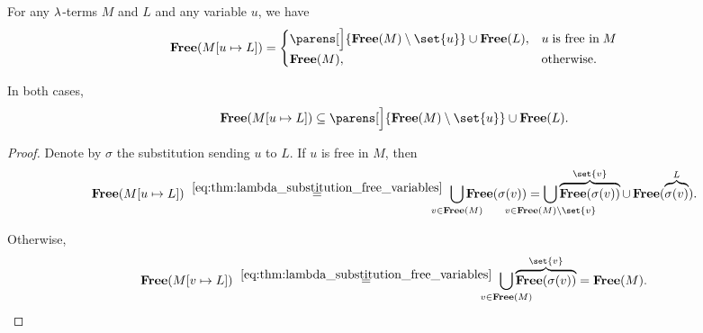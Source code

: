 \begin{corollary}\label{thm:lambda_substitution_free_variables_single}
  For any \( \mathrm{\lambda} \)-terms \( M \) and \( L \) and any variable \( u \), we have
  \begin{equation}\label{eq:thm:lambda_substitution_free_variables_single}
    \op*{Free}( M[u \mapsto L] ) = \begin{cases}
      \parens[\Big]{ \op*{Free}(M) \setminus \set{ u } } \cup \op*{Free}(L), &u \T{is free in} M \\
      \op*{Free}(M),                                                         &\T{otherwise.}
    \end{cases}
  \end{equation}

  In both cases,
  \begin{equation}\label{eq:thm:lambda_substitution_free_variables_single/subset}
    \op*{Free}( M[u \mapsto L] ) \subseteq \parens[\Big]{ \op*{Free}(M) \setminus \set{ u } } \cup \op*{Free}(L).
  \end{equation}
\end{corollary}
\begin{proof}
  Denote by \( \sigma \) the substitution sending \( u \) to \( L \). If \( u \) is free in \( M \), then
  \begin{equation*}
    \op*{Free}(M[u \mapsto L])
    \reloset{\eqref{eq:thm:lambda_substitution_free_variables}} =
    \bigcup_{\mathclap{v \in \op*{Free}(M)}} \op*{Free}(\sigma(v))
    =
    \bigcup_{\mathclap{v \in \op*{Free}(M) \setminus \set{ v }}} \overbrace{\op*{Free}(\sigma(v))}^{\set{ v }} \cup \op*{Free}(\overbrace{\sigma(v)}^L).
  \end{equation*}

  Otherwise,
  \begin{equation*}
    \op*{Free}(M[v \mapsto L])
    \reloset{\eqref{eq:thm:lambda_substitution_free_variables}} =
    \bigcup_{\mathclap{v \in \op*{Free}(M)}} \overbrace{\op*{Free}(\sigma(v))}^{\set{ v }}
    =
    \op*{Free}(M).
  \end{equation*}
\end{proof}

